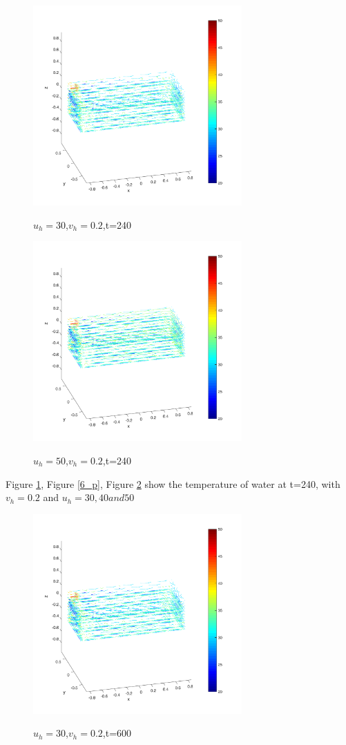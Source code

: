 \documentclass[12pt,a4paper,titlepage]{article}
\begin{document}
 
\begin{figure}[htb]
  \centering
  \includegraphics[width=8cm]{8-2.pdf}\\
  \caption{$u_h=30$,$v_h=0.2$,t=240}\label{11_p}
\end{figure}

\begin{figure}[htb]
  \centering
  \includegraphics[width=8cm]{4-2.pdf}\\
  \caption{$u_h=50$,$v_h=0.2$,t=240}\label{12_p}
\end{figure}
 
 
Figure \ref{11_p}, Figure \ref{6_p}, Figure \ref{12_p} show the temperature of water at t=240, with $v_h=0.2$ and $u_h=30, 40 and 50$

\begin{figure}[htb]
  \centering
  \includegraphics[width=8cm]{8-5.pdf}\\
  \caption{$u_h=30$,$v_h=0.2$,t=600}\label{13_p}
\end{figure}
\end{document}
